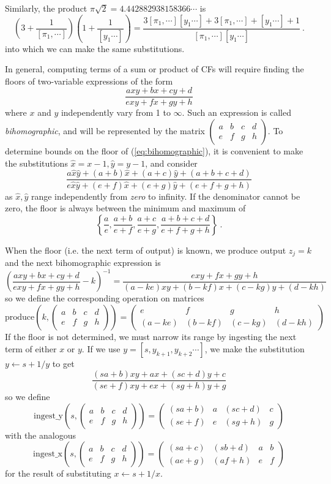 \documentclass[11pt, oneside]{amsart}   	%
\newcommand{\bihomographic}[8]{\left(\begin{smallmatrix}#1&#2&#3&#4\\#5&#6&#7&#8\end{smallmatrix}\right)}
\newcommand{\abcd}{\left(
\begin{smallmatrix} 
a & b & c & d\\ 
e & f & g & h
\end{smallmatrix}
\right)}
\begin{document}
Similarly, the product $\pi\sqrt{2}=4.442882938158366\cdots$ is
\begin{equation*}
(3 + \frac{1}{[\pi_1,\cdots]})(1 + \frac{1}{[y_1\cdots]}) 
  = \frac{ 3[\pi_1,\cdots][y_1\cdots] + 3[\pi_1,\cdots] + [y_1\cdots] +1 }{[\pi_1,\cdots][y_1\cdots] }\ .
\end{equation*}
into which we can make the same substitutions. 

In general, computing terms of a sum or product of CFs will require finding the floors of two-variable expressions of the form
\begin{equation}\label{eq:bihomographic}
\frac{axy + bx + cy + d}{exy + fx + gy + h}
\end{equation}
where $x$ and $y$ independently vary from 1 to $\infty$. Such an expression is called \emph{bihomographic}, and will be
represented by the matrix $\abcd$. To determine bounds on the floor of (\ref{eq:bihomographic}), it is convenient to make the
substitutions $\hat{x} = x-1, \hat{y} = y-1$, and consider
\[
\frac{a\hat{x}\hat{y} + (a+b)\hat{x} + (a+c)\hat{y} + (a+b+c+d)}{e\hat{x}\hat{y} + (e+f)\hat{x} + (e+g)\hat{y} + (e+f+g+h)}
\]
as $\hat{x}, \hat{y}$ range independently from \emph{zero} to infinity. If the denominator cannot be zero, the floor is always
between the minimum and maximum of
\[
\left\{ \frac{a}{e},\frac{a+b}{e+f},\frac{a+c}{e+g},\frac{a+b+c+d}{e+f+g+h} \right\}\ .
\]

When the floor (i.e. the next term of output) is known, we produce output $z_j=k$ and the next bihomographic expression is
\[
\left(\frac{axy + bx + cy + d}{exy + fx + gy + h} - k\right)^{-1} = \frac{exy + fx + gy + h}{(a-ke)xy + (b-kf)x + (c-kg)y + (d-kh)}
\]
so we define the corresponding operation on matrices
\begin{equation}
\mbox{produce}(k, \abcd) = \bihomographic{e}{f}{g}{h}{(a-ke)}{(b-kf)}{(c-kg)}{(d-kh)}
\end{equation}
 If the floor is not determined, we must narrow its range by ingesting the next term of either $x$ or $y$.
 If we use $y = [s,y_{k+1},y_{k+2}\cdots]$, we make the substitution $y \leftarrow s + 1/y$ to get
\[
\frac{(sa+b)xy + ax + (sc+d)y + c}{(se+f)xy + ex + (sg+h)y + g}
\]
so we define
\begin{equation}
\mbox{ingest\_y}(s, \abcd) = \bihomographic{(sa+b)}{a}{(sc+d)}{c}{(se+f)}{e}{(sg+h)}{g}
\end{equation}
with the analogous 
\begin{equation}
\mbox{ingest\_x}(s, \abcd) = \bihomographic{(sa+c)}{(sb+d)}{a}{b} {(ae+g)}{(af+h)}{e}{f}
\end{equation} 
for the result of substituting $x \leftarrow s + 1/x$.
\end{document}
